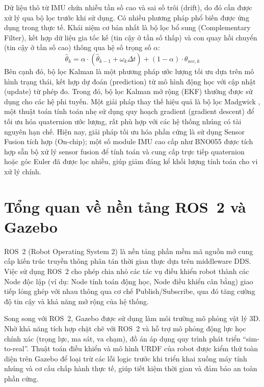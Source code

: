 Dữ liệu thô từ IMU chứa nhiễu tần số cao và sai số trôi (drift), do đó cần được xử lý qua bộ lọc trước khi sử dụng. Có nhiều phương pháp phổ biến được ứng dụng trong thực tế. Khái niệm cơ bản nhất là bộ lọc bổ sung (Complementary Filter), kết hợp dữ liệu gia tốc kế (tin cậy ở tần số thấp) và con quay hồi chuyển (tin cậy ở tần số cao) thông qua hệ số trọng số $\alpha$:
\begin{equation}
    \hat{\theta}_k = \alpha \cdot (\hat{\theta}_{k-1} + \omega_k \Delta t) + (1-\alpha) \cdot \theta_{acc,k}
\end{equation}
Bên cạnh đó, bộ lọc Kalman là một phương pháp ước lượng tối ưu dựa trên mô hình trạng thái, kết hợp dự đoán (prediction) từ mô hình động học với cập nhật (update) từ phép đo. Trong đó, bộ lọc Kalman mở rộng (EKF) thường được sử dụng cho các hệ phi tuyến. Một giải pháp thay thế hiệu quả là bộ lọc Madgwick \cite{madgwick2011}, một thuật toán tính toán nhẹ sử dụng quy hoạch gradient (gradient descent) để tối ưu hóa quaternion ước lượng, rất phù hợp với các hệ thống nhúng có tài nguyên hạn chế. Hiện nay, giải pháp tối ưu hóa phần cứng là sử dụng Sensor Fusion tích hợp (On-chip); một số module IMU cao cấp như BNO055 được tích hợp sẵn bộ xử lý sensor fusion để tính toán và cung cấp trực tiếp quaternion hoặc góc Euler đã được lọc nhiễu, giúp giảm đáng kể khối lượng tính toán cho vi xử lý chính.

\section{Tổng quan về nền tảng ROS~2 và Gazebo}

ROS~2 (Robot Operating System 2) \cite{ros2docs} là nền tảng phần mềm mã nguồn mở cung cấp kiến trúc truyền thông phân tán thời gian thực dựa trên middleware DDS. Việc sử dụng ROS~2 cho phép chia nhỏ các tác vụ điều khiển robot thành các Node độc lập (ví dụ: Node tính toán động học, Node điều khiển cân bằng) giao tiếp lỏng ghép với nhau thông qua cơ chế Publish/Subscribe, qua đó tăng cường độ tin cậy và khả năng mở rộng của hệ thống.

Song song với ROS~2, Gazebo \cite{gazebo} được sử dụng làm môi trường mô phỏng vật lý 3D. Nhờ khả năng tích hợp chặt chẽ với ROS~2 và hỗ trợ mô phỏng động lực học chính xác (trọng lực, ma sát, va chạm), đồ án áp dụng quy trình phát triển ``sim-to-real''. Thuật toán điều khiển và mô hình URDF của robot được kiểm thử toàn diện trên Gazebo để loại trừ các lỗi logic trước khi triển khai xuống máy tính nhúng và cơ cấu chấp hành thực tế, giúp tiết kiệm thời gian và đảm bảo an toàn phần cứng.
